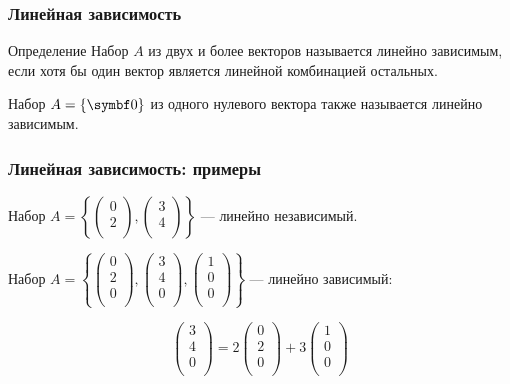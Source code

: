 \begin{frame}
\frametitle{Линейная зависимость}


\begin{block}{Определение}
Набор $A$ из двух и более векторов называется 
\alert{линейно зависимым}, если хотя бы один вектор является линейной комбинацией остальных.


Набор $A = \{\bzero\}$ из одного нулевого вектора также называется \alert{линейно зависимым}.
\end{block}


\end{frame}


\begin{frame}
\frametitle{Линейная зависимость: примеры}



Набор $A = \left\{ \begin{pmatrix}
      0 \\
      2 \\
    \end{pmatrix}, \begin{pmatrix}
      3 \\
      4 \\
    \end{pmatrix} \right\}$ — линейно независимый.

\pause

Набор $A = \left\{ \begin{pmatrix}
      0 \\
      2 \\
      0 \\
    \end{pmatrix}, \begin{pmatrix}
      3 \\
      4 \\
      0 \\
    \end{pmatrix},
    \begin{pmatrix}
      1 \\
      0 \\
      0 \\
    \end{pmatrix} \right\}$ — линейно зависимый:

    \[
      \begin{pmatrix}
        3 \\
        4 \\
        0 \\
      \end{pmatrix} = 2
    \begin{pmatrix}
      0 \\
      2 \\
      0 \\
    \end{pmatrix} + 3
    \begin{pmatrix}
      1 \\
      0 \\
      0 \\
    \end{pmatrix}  
    \]
  

\end{frame}


